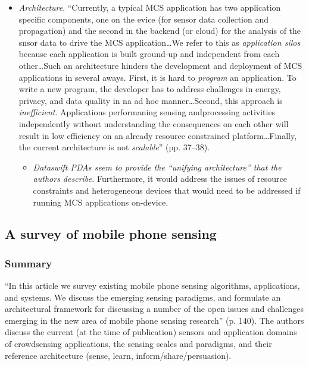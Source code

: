 \begin{itemize}
\begin{itemize}
	\item \emph{Architecture}. ``Currently, a typical MCS application has two application specific components, one on the evice (for sensor data collection and propagation) and the second in the backend (or cloud) for the analysis of the snsor data to drive the MCS application{\ldots}We refer to this as \emph{application silos} because each application is built ground-up and independent from each other{\ldots}Such an architecture hinders the development and deployment of MCS applications in several aways. First, it is hard to \emph{program} an application. To write a new program, the developer has to address challenges in energy, privacy, and data quality in na ad hoc manner{\ldots}Second, this approach is \emph{inefficient}. Applications performaning sensing andprocessing activities independently without understanding the consequences on each other will result in low efficiency on an already resource constrained platform{\ldots}Finally, the current architecture is not \emph{scalable}'' (pp. 37--38).
		\begin{itemize}
		\item \emph{Dataswift PDAs seem to provide the ``unifying architecture'' that the authors describe.} Furthermore, it would address the issues of resource constraints and heterogeneous devices that would need to be addressed if running MCS applications on-device.
		\end{itemize}
	\end{itemize}
\end{itemize}

\subsection{A survey of mobile phone sensing}
\subsubsection*{Summary}
``In this article we survey existing mobile phone sensing algorithms, applications, and systems. We discuss the emerging sensing paradigms, and formulate an architectural framework for discussing a number of the open issues and challenges emerging in the new area of mobile phone sensing research'' (p. 140). The authors discuss the current (at the time of publication) sensors and application domains of crowdsensing applications, the sensing scales and paradigms, and their reference architecture (sense, learn, inform/share/persuasion).

